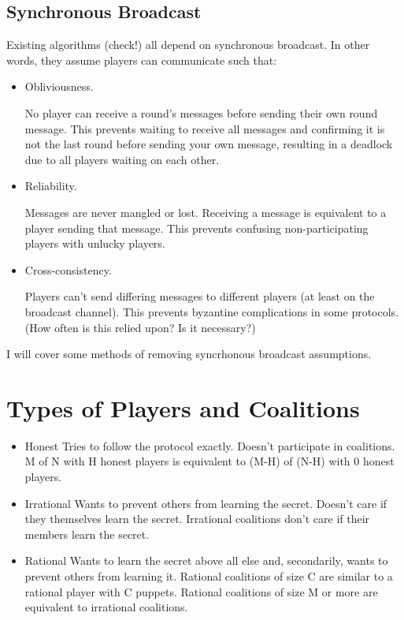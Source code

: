 \documentclass{article}
\begin{document}
\subsection{Synchronous Broadcast}
Existing algorithms (check!) all depend on synchronous broadcast. In other words, they assume players can communicate such that:
\begin{itemize}
\item Obliviousness.

	No player can receive a round's messages before sending their own round message. This prevents waiting to receive all messages and confirming it is not the last round before sending your own message, resulting in a deadlock due to all players waiting on each other.

\item Reliability.

	Messages are never mangled or lost. Receiving a message is equivalent to a player sending that message. This prevents confusing non-participating players with unlucky players.

\item Cross-consistency.

	Players can't send differing messages to different players (at least on the broadcast channel). This prevents byzantine complications in some protocols. (How often is this relied upon? Is it necessary?)
\end{itemize}

I will cover some methods of removing syncrhonous broadcast assumptions.

\section{Types of Players and Coalitions}

\begin{itemize}
  \item Honest
  \subitem Tries to follow the protocol exactly.
  \subitem Doesn't participate in coalitions.
  \subitem M of N with H honest players is equivalent to (M-H) of (N-H) with 0 honest players.
  \item Irrational
  \subitem Wants to prevent others from learning the secret. Doesn't care if they themselves learn the secret.
  \subitem Irrational coalitions don't care if their members learn the secret.
  \item Rational
  \subitem Wants to learn the secret above all else and, secondarily, wants to prevent others from learning it.
  \subitem Rational coalitions of size C are similar to a rational player with C puppets.
  \subitem Rational coalitions of size M or more are equivalent to irrational coalitions. 
\end{itemize}
\end{document}
